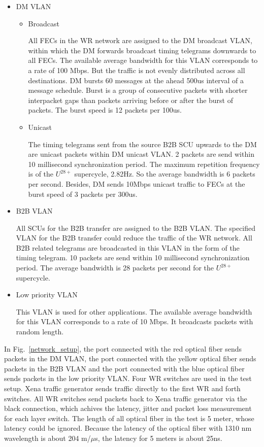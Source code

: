 \begin{itemize}
    \item DM VLAN 
		\begin{itemize}
			\item Broadcast

All FECs in the WR network are assigned to the DM broadcast VLAN, within which the DM forwards broadcast timing telegrams downwards to all FECs. The available average bandwidth for this VLAN corresponds to a rate of 100 Mbps. But the traffic is not evenly distributed across all destinations. DM bursts 60 messages at the ahead 500us interval of a message schedule. Burst is a group of consecutive packets with shorter interpacket gaps than packets arriving before or after the burst of packets. The burst speed is 12 packets per 100us.
 			\item Unicast

The timing telegrams sent from the source B2B SCU upwards to the DM are unicast packets within DM unicast VLAN. 2 packets are send within 10 millisecond synchronization period. The maximum repetition frequency is of the $U^{28+}$ supercycle, 2.82Hz. So the average bandwidth is 6 packets per second. Besides, DM sends 10Mbps unicast traffic to FECs at the burst speed of 3 packets per 300us.
		\end{itemize}
	\item B2B VLAN

All SCUs for the B2B transfer are assigned to the B2B VLAN. The specified VLAN for the B2B transfer could reduce the traffic of the WR network. All B2B related telegrams are broadcasted in this VLAN in the form of the timing telegram. 10 packets are send within 10 millisecond synchronization period. The average bandwidth is 28 packets per second for the $U^{28+}$ supercycle.
	\item Low priority VLAN

This VLAN is used for other applications. The available average bandwidth for this VLAN corresponds to a rate of 10 Mbps. It broadcasts packets with random length. 
\end{itemize}

    In Fig.~\ref{network_setup}, the port connected with the red optical fiber sends packets in the DM VLAN, the port connected with the yellow optical fiber sends packets in the B2B VLAN and the port connected with the blue optical fiber sends packets in the low priority VLAN. Four WR switches are used in the test setup. Xena traffic generator sends traffic directly to the first WR and forth switches. All WR switches send packets back to Xena traffic generator via the black connection, which achives the latency, jitter and packet loss measurement for each layer switch. The length of all optical fiber in the test is 5 meter, whose latency could be ignored. Because the latency of the optical fiber with 1310 nm wavelength is about 204 m/$\mu$s, the latency for 5 meters is about 25ns.

